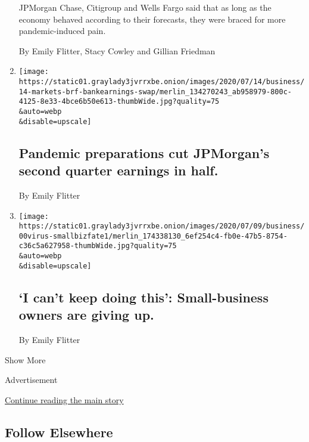 \begin{enumerate}
  JPMorgan Chase, Citigroup and Wells Fargo said that as long as the
  economy behaved according to their forecasts, they were braced for
  more pandemic-induced pain.

  By Emily Flitter, Stacy Cowley and Gillian Friedman
\item
  \href{/2020/07/14/business/pandemic-preparations-cut-jpmorgans-second-quarter-earnings-in-half.html}{}

  \texttt{[image: https://static01.graylady3jvrrxbe.onion/images/2020/07/14/business/14-markets-brf-bankearnings-swap/merlin\_134270243\_ab958979-800c-4125-8e33-4bce6b50e613-thumbWide.jpg?quality=75\\\&auto=webp\\\&disable=upscale]}

  \hypertarget{pandemic-preparations-cut-jpmorgans-second-quarter-earnings-in-half}{%
  \subsection{Pandemic preparations cut JPMorgan's second quarter
  earnings in
  half.}\label{pandemic-preparations-cut-jpmorgans-second-quarter-earnings-in-half}}

  By Emily Flitter
\item
  \href{/2020/07/14/business/i-cant-keep-doing-this-small-business-owners-are-giving-up.html}{}

  \texttt{[image: https://static01.graylady3jvrrxbe.onion/images/2020/07/09/business/00virus-smallbizfate1/merlin\_174338130\_6ef254c4-fb0e-47b5-8754-c36c5a627958-thumbWide.jpg?quality=75\\\&auto=webp\\\&disable=upscale]}

  \hypertarget{i-cant-keep-doing-this-small-business-owners-are-giving-up}{%
  \subsection{`I can't keep doing this': Small-business owners are
  giving
  up.}\label{i-cant-keep-doing-this-small-business-owners-are-giving-up}}

  By Emily Flitter
\end{enumerate}

Show More

Advertisement

\protect\hyperlink{after-mid2}{Continue reading the main story}

\hypertarget{follow-elsewhere}{%
\subsection{Follow Elsewhere}\label{follow-elsewhere}}


